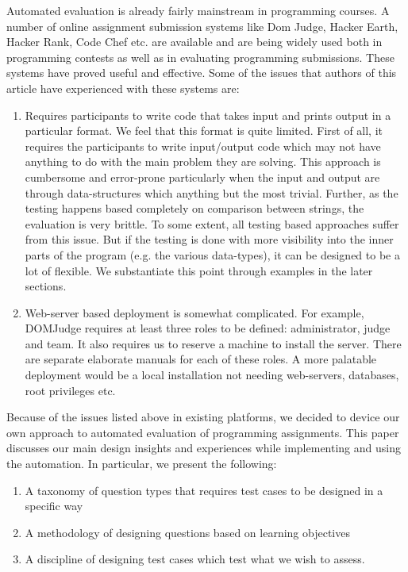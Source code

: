 \documentclass{article}
\begin{document}
Automated evaluation is already fairly mainstream in programming courses. A number of online assignment submission systems like Dom Judge, Hacker Earth, Hacker Rank, Code Chef etc. are available and are being widely used both in programming contests as well as in evaluating programming submissions. These systems have proved useful and effective. Some of the issues that authors of this article have experienced with these systems are:
\begin{enumerate}
\item Requires participants to write code that takes input and prints output in a particular format. We feel that this format is quite limited. First of all, it requires the participants to write input/output code which may not have anything to do with the main problem they are solving. This approach is cumbersome and error-prone particularly when the input and output are through data-structures which anything but the most trivial. Further, as the testing happens based completely on comparison between strings, the evaluation is very brittle. To some extent, all testing based approaches suffer from this issue. But if the testing is done with more visibility into the inner parts of the program (e.g. the various data-types), it can be designed to be a lot of flexible. We substantiate this point through examples in the later sections.
\item Web-server based deployment is somewhat complicated. For example, DOMJudge requires at least three roles to be defined: administrator, judge and team. It also requires us to reserve a machine to install the server. There are separate elaborate manuals for each of these roles. A more palatable deployment would be a local installation not needing web-servers, databases, root privileges etc.
\end{enumerate}

Because of the issues listed above in existing platforms, we decided to device our own approach to automated evaluation of programming assignments. This paper discusses our main design insights and experiences while implementing and using the automation. In particular, we present the following:
\begin{enumerate}
\item A taxonomy of question types that requires test cases to be designed in a specific way
\item A methodology of designing questions based on learning objectives
\item A discipline of designing test cases which test what we wish to assess.
\end{enumerate}
\end{document}
